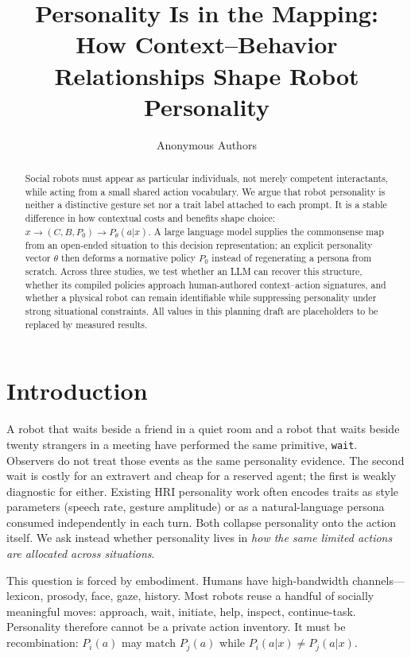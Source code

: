 \documentclass[letterpaper,10pt,conference]{ieeeconf}
\title{Personality Is in the Mapping:\\How Context--Behavior Relationships Shape Robot Personality}
\author{Anonymous Authors}
\begin{document}
\maketitle
\thispagestyle{empty}
\pagestyle{empty}

\begin{abstract}
Social robots must appear as particular individuals, not merely competent interactants, while acting from a small shared action vocabulary. We argue that robot personality is neither a distinctive gesture set nor a trait label attached to each prompt. It is a stable difference in how contextual costs and benefits shape choice: $x \!\rightarrow\! (C,B,P_0) \!\rightarrow\! P_\theta(a|x)$. A large language model supplies the commonsense map from an open-ended situation to this decision representation; an explicit personality vector $\theta$ then deforms a normative policy $P_0$ instead of regenerating a persona from scratch. Across three studies, we test whether an LLM can recover this structure, whether its compiled policies approach human-authored context--action signatures, and whether a physical robot can remain identifiable while suppressing personality under strong situational constraints. All values in this planning draft are placeholders to be replaced by measured results.
\end{abstract}

\section{Introduction}
A robot that waits beside a friend in a quiet room and a robot that waits beside twenty strangers in a meeting have performed the same primitive, \texttt{wait}. Observers do not treat those events as the same personality evidence. The second wait is costly for an extravert and cheap for a reserved agent; the first is weakly diagnostic for either. Existing HRI personality work often encodes traits as style parameters (speech rate, gesture amplitude) or as a natural-language persona consumed independently in each turn. Both collapse personality onto the action itself. We ask instead whether personality lives in \emph{how the same limited actions are allocated across situations}.

This question is forced by embodiment. Humans have high-bandwidth channels---lexicon, prosody, face, gaze, history. Most robots reuse a handful of socially meaningful moves: approach, wait, initiate, help, inspect, continue-task. Personality therefore cannot be a private action inventory. It must be recombination: $P_i(a)$ may match $P_j(a)$ while $P_i(a|x) \neq P_j(a|x)$.
\end{document}
